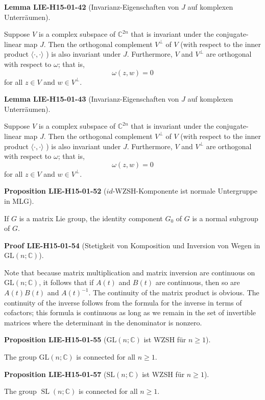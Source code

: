 \documentclass[10pt, letterpaper]{article}
\newcommand{\C}{\mathbb{C}}
\newcommand{\GL}{\mathrm{GL}}
\newcommand{\SL}{\mathrm{SL}}
\newcommand{\CustomHeading}[3]{%
  \par\medskip\noindent%
  \textbf{#1 #2} \textnormal{(#3)}.\enskip%
}
\newenvironment{PROP}[2]{\CustomHeading{Proposition}{#1}{#2}}{}
\newenvironment{LEM}[2]{\CustomHeading{Lemma}{#1}{#2}}{}
\newenvironment{PROOF}[2]{\CustomHeading{Proof}{#1}{#2}}{}
\begin{document}
\begin{LEM}{LIE-H15-01-42}{Invarianz-Eigenschaften von $J$ auf komplexen Unterräumen}
Suppose $V$ is a complex subspace of $\mathbb{C}^{2 n}$ that is invariant under the conjugate-linear map $J$. Then the orthogonal complement $V^{\perp}$ of $V$ (with respect to the inner product $\langle\cdot, \cdot\rangle$ ) is also invariant under $J$. Furthermore, $V$ and $V^{\perp}$ are orthogonal with respect to $\omega$; that is,
$$
\omega(z, w)=0
$$
for all $z \in V$ and $w \in V^{\perp}$.
\end{LEM}

\begin{LEM}{LIE-H15-01-43}{Invarianz-Eigenschaften von $J$ auf komplexen Unterräumen}
Suppose $V$ is a complex subspace of $\mathbb{C}^{2 n}$ that is invariant under the conjugate-linear map $J$. Then the orthogonal complement $V^{\perp}$ of $V$ (with respect to the inner product $\langle\cdot, \cdot\rangle$ ) is also invariant under $J$. Furthermore, $V$ and $V^{\perp}$ are orthogonal with respect to $\omega$; that is,
$$
\omega(z, w)=0
$$
for all $z \in V$ and $w \in V^{\perp}$.
\end{LEM}

\begin{PROP}{LIE-H15-01-52}{$id$-WZSH-Komponente ist normale Untergruppe in MLG}
If $G$ is a matrix Lie group, the identity component $G_{0}$ of $G$ is a normal subgroup of $G$.
\end{PROP}

\begin{PROOF}{LIE-H15-01-54}{Stetigkeit von Komposition und Inversion von Wegen in $\GL(n;\C)$}
Note that because matrix multiplication and matrix inversion are continuous on $\mathrm{GL}(n ; \mathbb{C})$, it follows that if $A(t)$ and $B(t)$ are continuous, then so are $A(t) B(t)$ and $A(t)^{-1}$. The continuity of the matrix product is obvious. The continuity of the inverse follows from the formula for the inverse in terms of cofactors; this formula is continuous as long as we remain in the set of invertible matrices where the determinant in the denominator is nonzero.
\end{PROOF}

\begin{PROP}{LIE-H15-01-55}{$\GL(n;\C)$ ist WZSH für $n\geq 1$}
The group $\mathrm{GL}(n ; \mathbb{C})$ is connected for all $n \geq 1$.
\end{PROP}

\begin{PROP}{LIE-H15-01-57}{$\SL(n;\C)$ ist WZSH für $n\geq 1$}
The group $\operatorname{SL}(n ; \mathbb{C})$ is connected for all $n \geq 1$.
\end{PROP}
\end{document}
